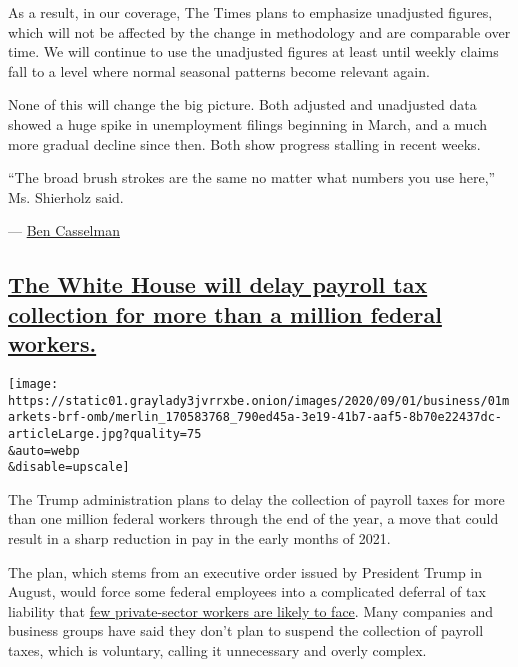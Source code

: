 As a result, in our coverage, The Times plans to emphasize unadjusted
figures, which will not be affected by the change in methodology and are
comparable over time. We will continue to use the unadjusted figures at
least until weekly claims fall to a level where normal seasonal patterns
become relevant again.

None of this will change the big picture. Both adjusted and unadjusted
data showed a huge spike in unemployment filings beginning in March, and
a much more gradual decline since then. Both show progress stalling in
recent weeks.

``The broad brush strokes are the same no matter what numbers you use
here,'' Ms. Shierholz said.

--- \href{https://www.nytimes3xbfgragh.onion/by/ben-casselman}{Ben
Casselman}

\hypertarget{the-white-house-will-delay-payroll-tax-collection-for-more-than-a-million-federal-workers}{%
\subsection{\texorpdfstring{\protect\hyperlink{the-white-house-will-delay-payroll-tax-collection-for-more-than-a-million-federal-workers}{The
White House will delay payroll tax collection for more than a million
federal
workers.}}{The White House will delay payroll tax collection for more than a million federal workers.}}\label{the-white-house-will-delay-payroll-tax-collection-for-more-than-a-million-federal-workers}}

\texttt{[image: https://static01.graylady3jvrrxbe.onion/images/2020/09/01/business/01markets-brf-omb/merlin\_170583768\_790ed45a-3e19-41b7-aaf5-8b70e22437dc-articleLarge.jpg?quality=75\\\&auto=webp\\\&disable=upscale]}

The Trump administration plans to delay the collection of payroll taxes
for more than one million federal workers through the end of the year, a
move that could result in a sharp reduction in pay in the early months
of 2021.

The plan, which stems from an executive order issued by President Trump
in August, would force some federal employees into a complicated
deferral of tax liability that
\href{https://www.nytimes3xbfgragh.onion/2020/08/27/us/politics/trump-payroll-tax-coronavirus.html}{few
private-sector workers are likely to face}. Many companies and business
groups have said they don't plan to suspend the collection of payroll
taxes, which is voluntary, calling it unnecessary and overly complex.

